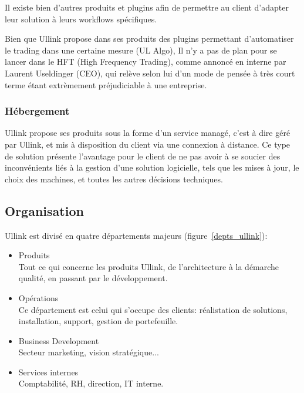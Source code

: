 \documentclass[a4paper, 12pt]{article}
\begin{document}
Il existe bien d'autres produits et plugins afin de permettre au client d'adapter leur solution à leurs workflows spécifiques.

Bien que Ullink propose dans ses produits des plugins permettant d'automatiser le trading dans une certaine mesure (UL Algo), Il n'y a pas de plan pour se lancer dans le HFT (High Frequency Trading), comme annoncé en interne par Laurent Useldinger (CEO), qui relève selon lui d'un mode de pensée à très court terme étant extrèmement préjudiciable à une entreprise.

\subsubsection{Hébergement}

Ullink propose ses produits sous la forme d'un service managé, c'est à dire géré par Ullink, et mis à disposition du client via une connexion à distance. Ce type de solution présente l'avantage pour le client de ne pas avoir à se soucier des inconvénients liés à la gestion d'une solution logicielle, tels que les mises à jour, le choix des machines, et toutes les autres décisions techniques.

\subsection{Organisation}

Ullink est divisé en quatre départements majeurs (figure~\ref{depts_ullink}):

\begin{itemize}
\item Produits\\
Tout ce qui concerne les produits Ullink, de l'architecture à la démarche qualité, en passant par le développement.

\item Opérations\\
Ce département est celui qui s'occupe des clients: réalistation de solutions, installation, support, gestion de portefeuille.

\item Business Development\\
Secteur marketing, vision stratégique...

\item Services internes\\
Comptabilité, RH, direction, IT interne.
\end{itemize}
\end{document}
